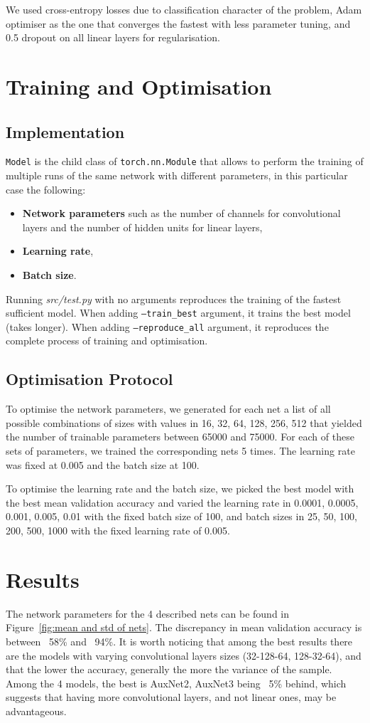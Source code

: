 \documentclass[10pt,conference,compsocconf]{IEEEtran}
\begin{document}
We used cross-entropy losses due to classification character of the problem, Adam optimiser as the one that converges the fastest with less parameter tuning, and 0.5 dropout on all linear layers for regularisation.

\section{Training and Optimisation}
\subsection{Implementation}
\texttt{Model} is the child class of \texttt{torch.nn.Module} that allows to perform the training of multiple runs of the same network with different parameters, in this particular case the following:
\begin{itemize}
    \item \textbf{Network parameters} such as the number of channels for convolutional layers and the number of hidden units for linear layers,
    \item \textbf{Learning rate},
    \item \textbf{Batch size}.
\end{itemize}
Running \textit{src/test.py} with no arguments reproduces the training of the fastest sufficient model. When adding \texttt{--train\_best} argument, it trains the best model (takes longer). When adding \texttt{--reproduce\_all} argument, it reproduces the complete process of training and optimisation.

\subsection{Optimisation Protocol}
To optimise the network parameters, we generated for each net a list of all possible combinations of sizes with values in {16, 32, 64, 128, 256, 512} that yielded the number of trainable parameters between 65000 and 75000. For each of these sets of parameters, we trained the corresponding nets 5 times. The learning rate was fixed at 0.005 and the batch size at 100.

To optimise the learning rate and the batch size, we picked the best model with the best mean validation accuracy and varied the learning rate in {0.0001, 0.0005, 0.001, 0.005, 0.01} with the fixed batch size of 100, and batch sizes in {25, 50, 100, 200, 500, 1000} with the fixed learning rate of 0.005.

\section{Results}
The network parameters for the 4 described nets can be found in Figure~\ref{fig:mean and std of nets}. The discrepancy in mean validation accuracy is between ~58\% and ~94\%. It is worth noticing that among the best results there are the models with varying convolutional layers sizes (32-128-64, 128-32-64), and that the lower the accuracy, generally the more the variance of the sample. Among the 4 models, the best is AuxNet2, AuxNet3 being ~5\% behind, which suggests that having more convolutional layers, and not linear ones, may be advantageous.
\end{document}
